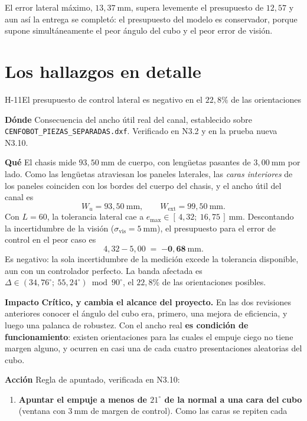 \documentclass[11pt,a4paper]{article}
\newcommand{\grados}{^{\circ}}
\newcommand{\campo}[1]{\par\smallskip\noindent\textbf{#1}\quad\ignorespaces}
\begin{document}
El error lateral máximo, $13{,}37\ \mathrm{mm}$, supera levemente el presupuesto de
$12{,}57$ y aun así la entrega se completó: el presupuesto del modelo es conservador,
porque supone simultáneamente el peor ángulo del cubo y el peor error de visión.

\newpage
\section{Los hallazgos en detalle}

\begin{hallazgo}{H-11}{El presupuesto de control lateral es negativo en el $22{,}8\%$ de las orientaciones}
\campo{Dónde} Consecuencia del ancho útil real del canal, establecido sobre
\texttt{CENFOBOT\_PIEZAS\_SEPARADAS.dxf}. Verificado en N3.2 y en la prueba nueva N3.10.
\campo{Qué} El chasis mide $93{,}50\ \mathrm{mm}$ de cuerpo, con lengüetas pasantes de
$3{,}00\ \mathrm{mm}$ por lado. Como las lengüetas atraviesan los paneles laterales, las
\emph{caras interiores} de los paneles coinciden con los bordes del cuerpo del chasis, y
el ancho útil del canal es
\[
  W_u = 93{,}50\ \mathrm{mm}, \qquad W_{\mathrm{ext}} = 99{,}50\ \mathrm{mm}.
\]
Con $L = 60$, la tolerancia lateral cae a
$e_{\max} \in [\,4{,}32;\ 16{,}75\,]\ \mathrm{mm}$. Descontando la incertidumbre de la
visión ($\sigma_{\mathrm{vis}} = 5\ \mathrm{mm}$), el presupuesto para el error de
control en el peor caso es
\[
  4{,}32 - 5{,}00 \;=\; \mathbf{-0{,}68\ \mathrm{mm}} .
\]
Es negativo: la sola incertidumbre de la medición excede la tolerancia disponible, aun
con un controlador perfecto. La banda afectada es
$\Delta \in (34{,}76\grados;\ 55{,}24\grados) \bmod 90\grados$, el $22{,}8\%$ de las
orientaciones posibles.
\campo{Impacto} \textbf{Crítico, y cambia el alcance del proyecto.} En las dos revisiones
anteriores conocer el ángulo del cubo era, primero, una mejora de eficiencia, y luego una
palanca de robustez. Con el ancho real \textbf{es condición de funcionamiento}: existen
orientaciones para las cuales el empuje ciego no tiene margen alguno, y ocurren en casi
una de cada cuatro presentaciones aleatorias del cubo.
\campo{Acción} Regla de apuntado, verificada en N3.10:
\begin{enumerate}[label=(\alph*),leftmargin=2em,itemsep=1pt,topsep=2pt]
\item \textbf{Apuntar el empuje a menos de $21\grados$ de la normal a una cara del cubo}
      (ventana con $3\ \mathrm{mm}$ de margen de control). Como las caras se repiten cada

\end{enumerate}
\end{hallazgo}
\end{document}
